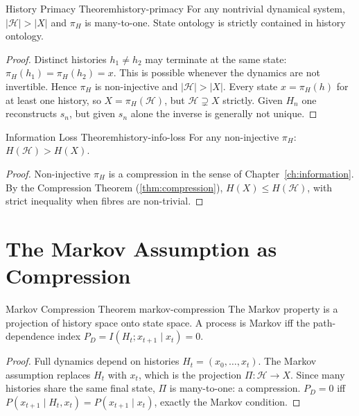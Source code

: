 \documentclass[12pt,twoside,openright]{book}
\newcommand{\hist}{\mathcal{H}}
\begin{document}
\begin{theorem}{History Primacy Theorem}{history-primacy}
  For any nontrivial dynamical system,
  $|\hist| > |X|$ and $\pi_H$ is many-to-one.
  State ontology is strictly contained in history ontology.
\end{theorem}

\begin{proof}
  Distinct histories $h_1 \ne h_2$ may terminate at the
  same state: $\pi_H(h_1) = \pi_H(h_2) = x$. This is
  possible whenever the dynamics are not invertible.
  Hence $\pi_H$ is non-injective and $|\hist| > |X|$.
  Every state $x = \pi_H(h)$ for at least one history,
  so $X = \pi_H(\hist)$, but $\hist \supsetneq X$ strictly.
  Given $H_n$ one reconstructs $s_n$, but given $s_n$
  alone the inverse is generally not unique.
\end{proof}

\begin{theorem}{Information Loss Theorem}{history-info-loss}
  For any non-injective $\pi_H$: $H(\hist) > H(X)$.
\end{theorem}

\begin{proof}
  Non-injective $\pi_H$ is a compression in the sense of
  Chapter~\ref{ch:information}. By the Compression Theorem
  (\cref{thm:compression}), $H(X) \le H(\hist)$, with
  strict inequality when fibres are non-trivial.
\end{proof}

\section{The Markov Assumption as Compression}
\label{sec:ch4-markov}

\begin{theorem}{Markov Compression Theorem}%
  {markov-compression}
  The Markov property is a projection of history space
  onto state space. A process is Markov iff the
  path-dependence index
  $P_D = I(H_t; x_{t+1} \mid x_t) = 0$.
\end{theorem}

\begin{proof}
  Full dynamics depend on histories
  $H_t = (x_0,\ldots,x_t)$. The Markov assumption
  replaces $H_t$ with $x_t$, which is the projection
  $\Pi: \hist \to X$. Since many histories share the
  same final state, $\Pi$ is many-to-one: a compression.
  $P_D = 0$ iff $P(x_{t+1} \mid H_t, x_t)
  = P(x_{t+1} \mid x_t)$, exactly the Markov condition.
\end{proof}
\end{document}
